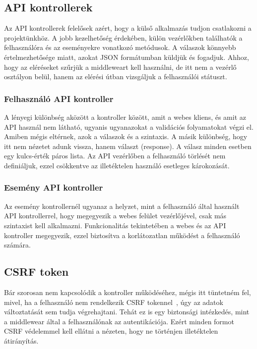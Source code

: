 \documentclass[
]{thesis-ekf}
\theoremstyle{definition}
\theoremstyle{remark}
\begin{document}
	\subsection{API kontrollerek}
	Az API kontrollerek felelősek azért, hogy a külső alkalmazás tudjon csatlakozni a projektünkhöz. A jobb kezelhetőség érdekében, külön vezérlőkben találhatók a felhasználóra és az eseményekre vonatkozó metódusok. A válaszok könnyebb értelmezhetősége miatt, azokat JSON formátumban küldjük és fogadjuk. Ahhoz, hogy az eléréseket szűrjük a middleweart kell használni, de itt nem a vezérlő osztályon belül, hanem az elérési útban vizsgáljuk a felhasználói státuszt.
	
	\subsubsection{Felhasználó API kontroller}
	A lényegi különbség aközött a kontroller között, amit a webes kliens, és amit az API használ nem látható, ugyanis ugyanazokat a validációs folyamatokat végzi el. Amiben mégis eltérnek, azok a válaszok és a szintaxis. A másik különbség, hogy itt nem nézetet adunk vissza, hanem választ (response). A válasz minden esetben egy kulcs-érték páros lista.
	Az API vezérlőben a felhasználó törlését nem definiáljuk, ezzel csökkentve az illetéktelen használó esetleges károkozását. 
	
	\subsubsection{Esemény API kontroller}
	Az esemény kontrollernél ugyanaz a helyzet, mint a felhasználó által használt API kontrollerrel, hogy megegyezik a webes felület vezérlőjével, csak más szintaxist kell alkalmazni. Funkcionalitás tekintetében a webes és az API kontroller megegyezik, ezzel biztosítva a korlátozatlan működést a felhasználó számára.
	
	\subsection{CSRF token}
	Bár szorosan nem kapcsolódik a kontroller működéséhez, mégis itt tüntetném fel, mivel, ha a felhasználó nem rendelkezik CSRF tokennel~\cite{laravel_csrf}, úgy az adatok változtatását sem tudja végrehajtani. Tehát ez is egy biztonsági intézkedés, mint a middlewear által a felhasználónak az autentikációja. Ezért minden formot CSRF védelemmel kell ellátni a nézeten, hogy ne történjen illetéktelen átirányítás.
	
\end{document}
